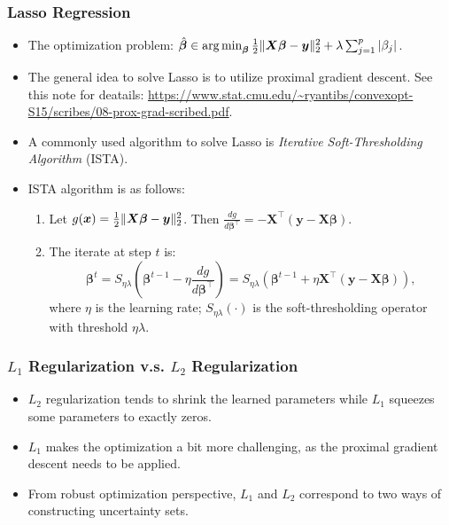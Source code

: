     \subsubsection{Lasso Regression}
        \begin{itemize}
            \item The optimization problem: $\hat{\bm{\beta}} \in \operatorname{arg\,min}_{\bm{\beta}} \frac{1}{2}\lVert\bm{X} \bm{\beta} - \bm{y}\rVert_2^2 + \lambda \sum_{j=1}^{p}{| \beta_j |}$.
            \item The general idea to solve Lasso is to utilize proximal gradient descent.
            See this note for deatails: \url{https://www.stat.cmu.edu/~ryantibs/convexopt-S15/scribes/08-prox-grad-scribed.pdf}.
            \item A commonly used algorithm to solve Lasso is \emph{Iterative Soft-Thresholding Algorithm} (ISTA). 
            \item ISTA algorithm is as follows:
                \begin{enumerate}
                    \item Let $g(\bm{x}) = \frac{1}{2}\lVert\bm{X} \bm{\beta} - \bm{y}\rVert_2^2$. Then $\frac{d g}{d \bm{\beta}^\top} = -\bm{X}^\top(\bm{y} - \bm{X}\bm{\beta})$.
                    \item The iterate at step $t$ is:
                        \begin{equation}
                            \bm{\beta}^t = S_{\eta \lambda}\left( 
                                \bm{\beta}^{t-1} - \eta \frac{d g}{d \bm{\beta}^\top} 
                            \right) = S_{\eta \lambda}\left( 
                                \bm{\beta}^{t-1} + \eta \bm{X}^\top(\bm{y} - \bm{X}\bm{\beta}) 
                            \right),
                        \end{equation}
                    where $\eta$ is the learning rate; $S_{\eta \lambda}(\cdot)$ is the soft-thresholding operator with threshold $\eta \lambda$. 
                \end{enumerate}
        \end{itemize}
    
    \subsubsection{$L_1$ Regularization v.s. $L_2$ Regularization}
        \begin{itemize}
            \item $L_2$ regularization tends to shrink the learned parameters while $L_1$ squeezes some parameters to exactly zeros.
            \item $L_1$ makes the optimization a bit more challenging, as the proximal gradient descent needs to be applied.
            \item From robust optimization perspective, $L_1$ and $L_2$ correspond to two ways of constructing uncertainty sets. 
        \end{itemize}
    
